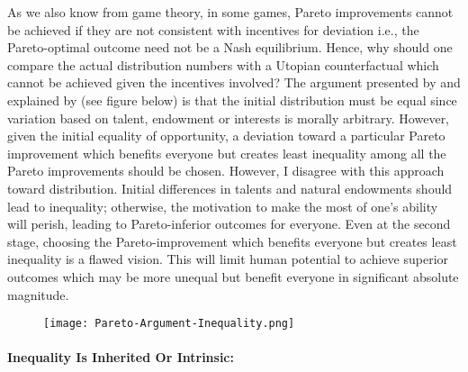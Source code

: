 \documentclass[12pt]{article}
\newcommand{\1}{\mathbbm 1}
\begin{document}
	    As we also know from game theory, in some games, Pareto improvements cannot be achieved if they are not consistent with incentives for deviation i.e., the Pareto-optimal outcome need not be a Nash equilibrium. Hence, why should one compare the actual distribution numbers with a Utopian counterfactual which cannot be achieved given the incentives involved? The argument presented by \cite{rawlstheory1971} and explained by \cite{fisher2011pareto} (see figure below) is that the initial distribution must be equal since variation based on talent, endowment or interests is morally arbitrary. However, given the initial equality of opportunity, a deviation toward a particular Pareto improvement which benefits everyone but creates least inequality among all the Pareto improvements should be chosen. However, I disagree with this approach toward distribution. Initial differences in talents and natural endowments should lead to inequality; otherwise, the motivation to make the most of one's ability will perish, leading to Pareto-inferior outcomes for everyone. Even at the second stage, choosing the Pareto-improvement which benefits everyone but creates least inequality is a flawed vision. This will limit human potential to achieve superior outcomes which may be more unequal but benefit everyone in significant absolute magnitude.
	    
	    
	    	\begin{figure}[H]
	    	\begin{center}
	    			\texttt{[image: Pareto-Argument-Inequality.png]}%
	    			\label{fig:a}%
	    	\end{center}
	    	\caption{\cite{fisher2011pareto}}
	    \end{figure}
	    
	    
	    
	    
	    
	    
	    \paragraph{Inequality Is Inherited Or Intrinsic:}
	    
\end{document}
